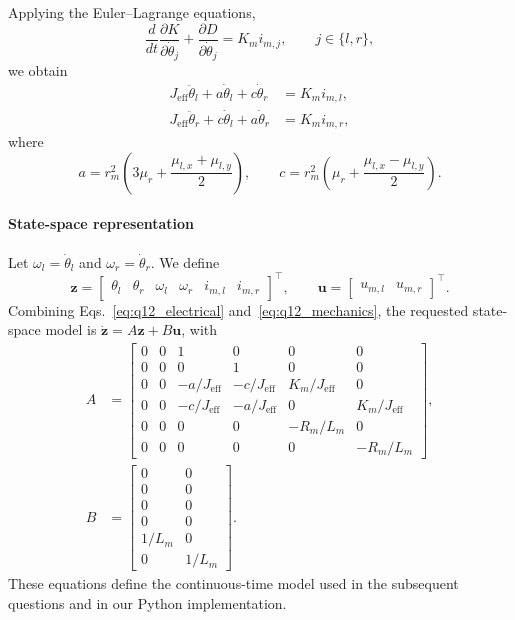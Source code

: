 \documentclass[a4paper,12pt]{article}
\begin{document}
Applying the Euler--Lagrange equations,
\begin{equation}
  \frac{d}{dt}\frac{\partial K}{\partial\dot\theta_j}
  +\frac{\partial D}{\partial\dot\theta_j}
  =K_m i_{m,j},\qquad j\in\{l,r\},
\end{equation}
we obtain
\begin{equation}
\begin{aligned}
  J_{\mathrm{eff}}\ddot\theta_l+a\dot\theta_l+c\dot\theta_r&=K_m i_{m,l},\\
  J_{\mathrm{eff}}\ddot\theta_r+c\dot\theta_l+a\dot\theta_r&=K_m i_{m,r},
\end{aligned}
\label{eq:q12_mechanics}
\end{equation}
where
\begin{equation}
  a=r_m^2\left(3\mu_r+\frac{\mu_{l,x}+\mu_{l,y}}{2}\right),\qquad
  c=r_m^2\left(\mu_r+\frac{\mu_{l,x}-\mu_{l,y}}{2}\right).
  \label{eq:q12_damping}
\end{equation}

\paragraph{State-space representation}
Let $\omega_l=\dot\theta_l$ and $\omega_r=\dot\theta_r$. We define
\begin{equation}
  \mathbf z=
  \begin{bmatrix}\theta_l&\theta_r&\omega_l&\omega_r&i_{m,l}&i_{m,r}\end{bmatrix}^{\!\top},
  \qquad
  \mathbf u=\begin{bmatrix}u_{m,l}&u_{m,r}\end{bmatrix}^{\!\top}.
\end{equation}
Combining Eqs.~\eqref{eq:q12_electrical} and~\eqref{eq:q12_mechanics}, the requested state-space model is $\dot{\mathbf z}=A\mathbf z+B\mathbf u$, with
\begin{equation}
\label{eq:q12_state_space}
\begin{aligned}
A&=\begin{bmatrix}
 0&0&1&0&0&0\\
 0&0&0&1&0&0\\
 0&0&-a/J_{\mathrm{eff}}&-c/J_{\mathrm{eff}}&K_m/J_{\mathrm{eff}}&0\\
 0&0&-c/J_{\mathrm{eff}}&-a/J_{\mathrm{eff}}&0&K_m/J_{\mathrm{eff}}\\
 0&0&0&0&-R_m/L_m&0\\
 0&0&0&0&0&-R_m/L_m
\end{bmatrix},\\[6pt]
B&=\begin{bmatrix}
 0&0\\0&0\\0&0\\0&0\\1/L_m&0\\0&1/L_m
\end{bmatrix}.
\end{aligned}
\end{equation}
These equations define the continuous-time model used in the subsequent questions and in our Python implementation.
\end{document}

